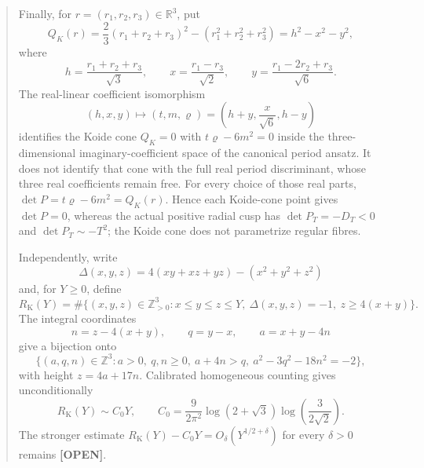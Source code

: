 \documentclass[11pt,letterpaper]{article}
\newcommand{\Status}[2]{\textcolor{#1}{\textbf{[#2]}}}
\newcommand{\Open}{\Status{Open}{OPEN}}
\theoremstyle{definition}
\theoremstyle{remark}
\begin{document}
\begin{abstract}
 Finally, for \(r=(r_1,r_2,r_3)\in\mathbb R^3\), put
 \[
  Q_K(r)=\frac23(r_1+r_2+r_3)^2-(r_1^2+r_2^2+r_3^2)
        =h^2-x^2-y^2,
 \]
 where
 \[
  h=\frac{r_1+r_2+r_3}{\sqrt3},\qquad
  x=\frac{r_1-r_3}{\sqrt2},\qquad
  y=\frac{r_1-2r_2+r_3}{\sqrt6}.
 \]
 The real-linear coefficient isomorphism
 \[
  (h,x,y)\longmapsto(t,m,\varrho)
  =\left(h+y,\frac{x}{\sqrt6},h-y\right)
 \]
 identifies the Koide cone \(Q_K=0\) with
 \(t\varrho-6m^2=0\) inside the three-dimensional imaginary-coefficient
 space of the canonical period ansatz.  It does not identify that cone with
 the full real period discriminant, whose three real coefficients remain
 free.  For every choice of those real parts,
 \(\det P=t\varrho-6m^2=Q_K(r)\).  Hence each Koide-cone point gives
 \(\det P=0\), whereas the actual positive radial cusp has
 \(\det P_T=-D_T<0\) and \(\det P_T\sim-T^2\); the Koide cone does not
 parametrize regular fibres.

 Independently, write
 \[
  \Delta(x,y,z)=4(xy+xz+yz)-(x^2+y^2+z^2)
 \]
 and, for \(Y\geq0\), define
 \[
  R_{\mathrm K}(Y)=\#\{(x,y,z)\in\mathbb Z_{>0}^3:
  x\leq y\leq z\leq Y,\ \Delta(x,y,z)=-1,\ z\geq4(x+y)\}.
 \]
 The integral coordinates
 \[
  n=z-4(x+y),\qquad q=y-x,\qquad a=x+y-4n
 \]
 give a bijection onto
 \[
  \{(a,q,n)\in\mathbb Z^3:a>0,\ q,n\geq0,\ a+4n>q,
    \ a^2-3q^2-18n^2=-2\},
 \]
 with height \(z=4a+17n\).  Calibrated homogeneous counting gives
 unconditionally
 \[
  R_{\mathrm K}(Y)\sim C_0Y,\qquad
  C_0=\frac9{2\pi^2}\log(2+\sqrt3)
      \log\!\left(\frac3{2\sqrt2}\right).
 \]
 The stronger estimate
 \(R_{\mathrm K}(Y)-C_0Y=O_\delta(Y^{1/2+\delta})\) for every
 \(\delta>0\) remains \Open.


\end{abstract}
\end{document}
